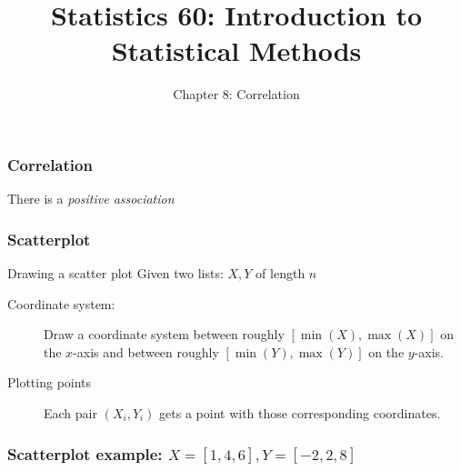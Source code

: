 \documentclass[handout]{beamer}
\title{Statistics 60: Introduction to Statistical Methods}
\subtitle{Chapter 8: Correlation}
\author{}%
\begin{document}
   \begin{frame}
   \titlepage
   \end{frame}



   \begin{frame}
   \frametitle{Correlation}
   \begin{center}
   \end{center}
   There is a {\em positive association}
   \end{frame}


   \begin{frame} \frametitle{Scatterplot}

   \begin{block}
   {Drawing a scatter plot}
   Given two lists: $X, Y$ of length $n$
   \begin{description}
   \item[Coordinate system:] Draw a coordinate system
   between roughly $[\min(X), \max(X)]$ on the $x$-axis and
   between roughly $[\min(Y), \max(Y)]$ on the $y$-axis.

   \item[Plotting points] Each pair $(X_i, Y_i)$ gets a point
   with those corresponding coordinates.
   \end{description}
   \end{block}
   \end{frame}



   \begin{frame}
   \frametitle{Scatterplot example: $X=[1,4,6], Y=[-2,2,8]$}
   \begin{center}
   \end{center}

   \end{frame}
\end{document}

